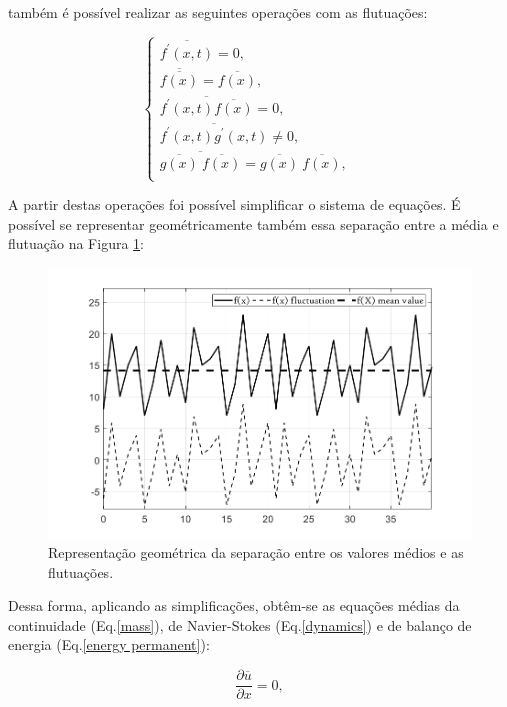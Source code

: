 também é possível realizar as seguintes operações com as flutuações:

\begin{equation}
  \begin{cases}
  \overline{f^\prime ({x} ,t)} = 0 , & \quad   \\
  \overline{\overline{f({x})}} = \overline{f({x})} , & \quad   \\
  \overline{f^\prime ({x} ,t)\overline{f({x})}} = 0 ,& \quad   \\
  \overline{f^\prime ({x} ,t)g^\prime ({x} ,t)} \neq 0 , & \quad   \\
  \overline{  \overline{g({x})} \ \overline{f({x})}  } = {\overline{g({x})}} \ {\overline{f({x})}} , & \quad   \\
  \end{cases}
\end{equation}

A partir destas operações foi possível simplificar o sistema de equações. É possível se representar geométricamente também essa separação entre a média e flutuação na Figura \ref{figura.1}:

\begin{figure}[h!]
	\centering
	\includegraphics[angle=0, scale=0.60]{medios}
	\caption{Representação geométrica da separação entre os valores médios e as flutuações.}
	\label{figura.1}
\end{figure}

Dessa forma, aplicando as simplificações, obtêm-se as equações médias da continuidade (Eq.\ref{mass}), de Navier-Stokes (Eq.\ref{dynamics}) e de balanço de energia (Eq.\ref{energy permanent}):

\begin{equation}\label{mass}
\frac{\partial \overline{u}}{\partial x} = 0,
\end{equation}

